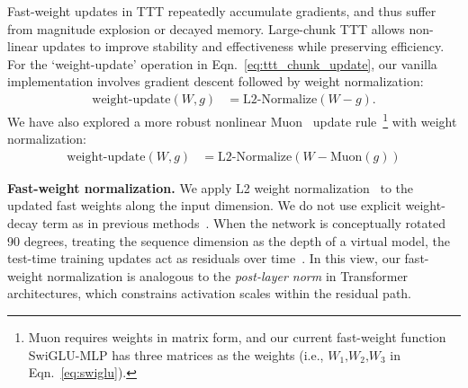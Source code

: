 Fast-weight updates in TTT repeatedly accumulate gradients, and thus suffer from magnitude explosion or decayed memory.
Large-chunk TTT allows non-linear updates to improve stability and effectiveness while preserving efficiency.
For the `weight\mbox{-}update' operation in Eqn.~\ref{eq:ttt_chunk_update}, our vanilla implementation involves gradient descent  followed by weight normalization:
\begin{align}
\mathrm{weight\mbox{-}update} (W, g) & = \mathrm{L2\mbox{-}Normalize} (W - g)  .
\label{eq:fast_weight_normalization_nomuon}
\end{align}
We have also explored a more robust nonlinear Muon~\cite{jordan2024muon} update rule~\footnote{Muon requires weights in matrix form, and our current fast-weight function SwiGLU-MLP has three matrices as the weights (i.e., $W_1\mbox{,}W_2\mbox{,}W_3$ in Eqn.~\ref{eq:swiglu}). } with weight normalization:
\begin{align}
\mathrm{weight\mbox{-}update} (W, g) & = \mathrm{L2\mbox{-}Normalize} (W - \mathrm{Muon}(g))  
\label{eq:fast_weight_normalization}
\end{align}

\noindent\textbf{Fast-weight normalization.} 
We apply L2 weight normalization~\cite{salimans2016weight} to the updated fast weights along the input dimension. We do not use explicit weight-decay term as in previous methods~\cite{behrouz2024titans, dao2024transformers, yang2024gated, sun2023retentive}. 
% 
When the network is conceptually rotated 90 degrees, treating the sequence dimension as the depth of a virtual model, the test-time training updates act as residuals over time~\cite{he2015deep}. In this view, our fast-weight normalization is analogous to the \textit{post-layer norm} in Transformer architectures, which constrains activation scales within the residual path.


